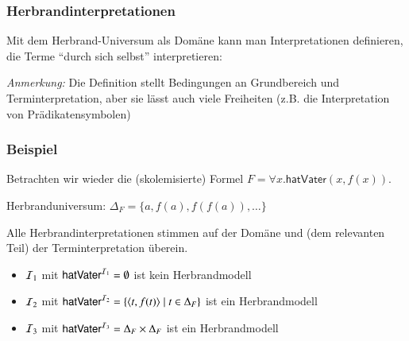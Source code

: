 \documentclass[aspectratio=1610,onlymath]{beamer}
\begin{document}
\begin{frame}\frametitle{Herbrandinterpretationen}

Mit dem Herbrand-Universum als Domäne kann man Interpretationen definieren, die Terme "`durch sich selbst"' interpretieren:\medskip


\emph{Anmerkung:} Die Definition stellt Bedingungen an Grundbereich und Terminterpretation, aber sie lässt auch viele Freiheiten (z.B. die Interpretation von Prädikatensymbolen)

\end{frame}

\begin{frame}\frametitle{Beispiel}

Betrachten wir wieder die (skolemisierte) Formel $F=\forall x.\textsf{hatVater}(x,f(x))$.\bigskip

Herbranduniversum: $\Delta_F=\{a,f(a),f(f(a)),\ldots\}$\medskip

Alle Herbrandinterpretationen stimmen auf der Domäne und (dem relevanten Teil) der Terminterpretation überein.
\begin{itemize}
\item $\mathcal{I}_1$ mit $\textsf{hatVater}^{\mathcal{I}_1}=\emptyset$ ist kein Herbrandmodell
\item $\mathcal{I}_2$ mit $\textsf{hatVater}^{\mathcal{I}_2}=\{\langle{t,f(t)}\rangle\mid t\in\Delta_F\}$ ist ein Herbrandmodell
\item $\mathcal{I}_3$ mit $\textsf{hatVater}^{\mathcal{I}_3}=\Delta_F\times\Delta_F$ ist ein Herbrandmodell
\end{itemize}

\end{frame}
\end{document}
